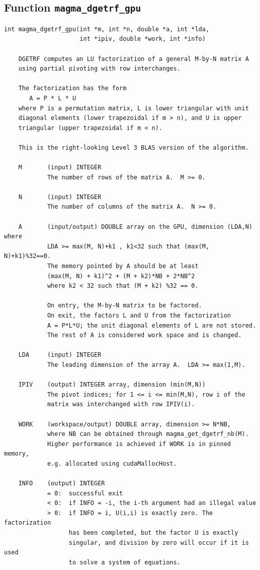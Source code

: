 \documentclass[10pt]{book}
\begin{document}
\newpage
\subsection{Function {\tt {\bf magma\_dgetrf\_gpu}}}
\begin{verbatim}
int magma_dgetrf_gpu(int *m, int *n, double *a, int *lda, 
                     int *ipiv, double *work, int *info)
   
    DGETRF computes an LU factorization of a general M-by-N matrix A   
    using partial pivoting with row interchanges.   

    The factorization has the form   
       A = P * L * U   
    where P is a permutation matrix, L is lower triangular with unit   
    diagonal elements (lower trapezoidal if m > n), and U is upper   
    triangular (upper trapezoidal if m < n).   

    This is the right-looking Level 3 BLAS version of the algorithm.   

    M       (input) INTEGER   
            The number of rows of the matrix A.  M >= 0.   

    N       (input) INTEGER   
            The number of columns of the matrix A.  N >= 0.   

    A       (input/output) DOUBLE array on the GPU, dimension (LDA,N) where
            LDA >= max(M, N)+k1 , k1<32 such that (max(M, N)+k1)%32==0.
            The memory pointed by A should be at least 
            (max(M, N) + k1)^2 + (M + k2)*NB + 2*NB^2
            where k2 < 32 such that (M + k2) %32 == 0.
                 
            On entry, the M-by-N matrix to be factored.   
            On exit, the factors L and U from the factorization   
            A = P*L*U; the unit diagonal elements of L are not stored.   
            The rest of A is considered work space and is changed.

    LDA     (input) INTEGER   
            The leading dimension of the array A.  LDA >= max(1,M).   

    IPIV    (output) INTEGER array, dimension (min(M,N))   
            The pivot indices; for 1 <= i <= min(M,N), row i of the   
            matrix was interchanged with row IPIV(i).   

    WORK    (workspace/output) DOUBLE array, dimension >= N*NB,
            where NB can be obtained through magma_get_dgetrf_nb(M).
            Higher performance is achieved if WORK is in pinned memory, 
            e.g. allocated using cudaMallocHost.

    INFO    (output) INTEGER   
            = 0:  successful exit   
            < 0:  if INFO = -i, the i-th argument had an illegal value   
            > 0:  if INFO = i, U(i,i) is exactly zero. The factorization   
                  has been completed, but the factor U is exactly   
                  singular, and division by zero will occur if it is used   
                  to solve a system of equations.   
\end{verbatim}
\end{document}
